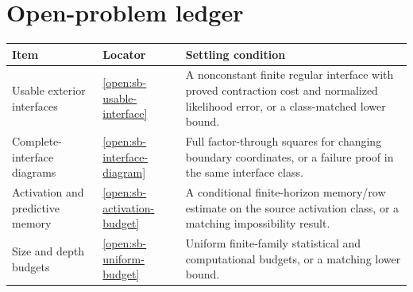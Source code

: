 \documentclass[11pt,letterpaper]{report}
\begin{document}
\section{Open-problem ledger}
\begin{longtable}{@{}p{}p{}p{}@{}}
\toprule
Item & Locator & Settling condition\\
\midrule
\endhead
Usable exterior interfaces & \cref{open:sb-usable-interface} & A nonconstant finite regular interface with proved contraction cost and normalized likelihood error, or a class-matched lower bound.\\
Complete-interface diagrams & \cref{open:sb-interface-diagram} & Full factor-through squares for changing boundary coordinates, or a failure proof in the same interface class.\\
Activation and predictive memory & \cref{open:sb-activation-budget} & A conditional finite-horizon memory/row estimate on the source activation class, or a matching impossibility result.\\
Size and depth budgets & \cref{open:sb-uniform-budget} & Uniform finite-family statistical and computational budgets, or a matching lower bound.\\
\bottomrule
\end{longtable}
\end{document}
